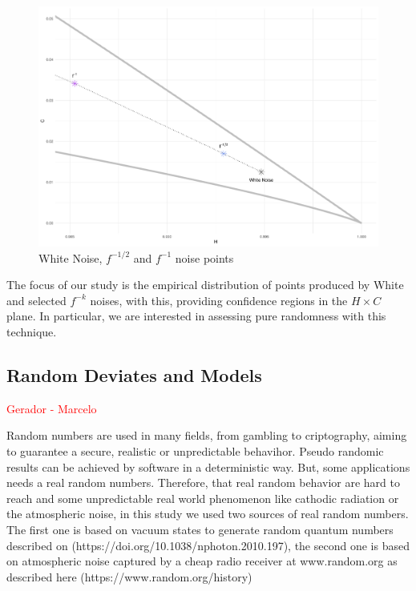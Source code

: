 \documentclass[sts]{imsart}
\begin{document}
\begin{figure}[hbt]
\centering
\includegraphics[width=\linewidth]{RightMostCorner}
\caption{White Noise, $f^{-1/2}$ and $f^{-1}$ noise points}\label{fig:RightMostCorner}
\end{figure}

The focus of our study is the empirical distribution of points produced by White and selected $f^{-k}$ noises, with this, providing confidence regions in the $H\times C$ plane.
In particular, we are interested in assessing pure randomness with this technique.

\subsection{Random Deviates and Models}

\textcolor{red}{Gerador - Marcelo}

Random numbers are used in many fields, from gambling to criptography, aiming to guarantee a secure, realistic or unpredictable behavihor. Pseudo randomic results can be achieved by software in a deterministic way. But, some applications needs a real random numbers. Therefore, that real random behavior are hard to reach and some unpredictable real world phenomenon like cathodic radiation or the atmospheric noise, in this study we used two sources of real random numbers. The first one is based on vacuum states to generate random quantum numbers described on (https://doi.org/10.1038/nphoton.2010.197), the second one is based on atmospheric noise captured by a cheap radio receiver at www.random.org as described  here (https://www.random.org/history)
\end{document}
